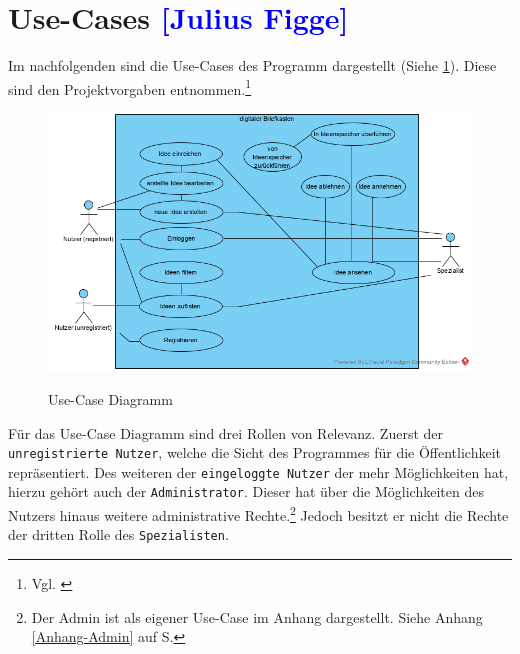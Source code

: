 
\section{Use-Cases  \textcolor{blue}{[Julius Figge]}}

Im nachfolgenden sind die Use-Cases des Programm dargestellt (Siehe \cref{fig:usecases}).
Diese sind den Projektvorgaben entnommen.\footnote{Vgl. \cite{Vorgaben2020}}

\begin{figure}[hbt]\label{usecase}
\centering
\begin{minipage}[t]{1\textwidth}
    \caption{Use-Case Diagramm}
    \includegraphics[width=1\textwidth]{img/createAnAccountWithSpamMailAccountYouSucker.png}\\
    \label{fig:usecases}
\end{minipage}
\end{figure}

Für das Use-Case Diagramm sind drei Rollen von Relevanz.
Zuerst der \texttt{unregistrierte Nutzer}, welche die Sicht des Programmes für die Öffentlichkeit repräsentiert.
Des weiteren der \texttt{eingeloggte Nutzer} der mehr Möglichkeiten hat, hierzu gehört auch der \texttt{Administrator}.
Dieser hat über die Möglichkeiten des Nutzers hinaus weitere administrative Rechte.\footnote{Der Admin ist als eigener Use-Case im Anhang dargestellt. Siehe Anhang \ref{Anhang-Admin} auf S.\pageref{Anhang-Admin}}
Jedoch besitzt er nicht die Rechte der dritten Rolle des \texttt{Spezialisten}.\\

